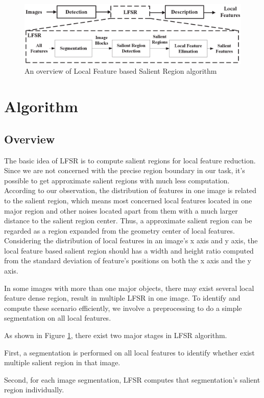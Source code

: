 \begin{figure}[!t]
\centering
\includegraphics[width=5.0in]{images/fig-overview.eps}
\caption{An overview of Local Feature based Salient Region algorithm}
\label{fig:overview}
\end{figure}

\section{Algorithm}
\label{sec:algorithm}

\subsection{Overview}
\label{sec:algorithm_overview}

The basic idea of LFSR is to compute salient regions for local feature reduction. Since we are not concerned with the precise region boundary in our task, it's possible to get approximate salient regions with much less computation. According to our observation, the distribution of features in one image is related to the salient region, which means most concerned local features located in one major region and other noises located apart from them with a much larger distance to the salient region center. Thus, a approximate salient region can be regarded as a region expanded from the geometry center of local features. Considering the distribution of local features in an image's x axis and y axis, the local feature based salient region should has a width and height ratio computed from the standard deviation of feature's positions on both the x axis and the y axis.

In some images with more than one major objects, there may exist several local feature dense region, result in multiple LFSR in one image. To identify and compute these scenario efficiently, we involve a preprocessing to do a simple segmentation on all local features. 

As shown in Figure \ref{fig:overview}, there exist two major stages in LFSR algorithm. 
\begin{inparaenum}
\item First, a segmentation is performed on all local features to identify whether exist multiple salient region in that image. 
\item Second, for each image segmentation, LFSR computes that segmentation's salient region individually.
\end{inparaenum}

